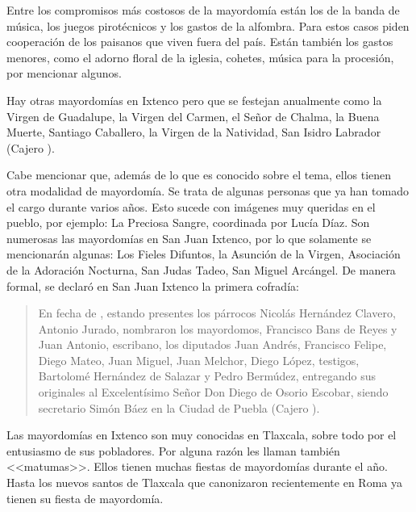 \documentclass[14pt,letterpaper,twoside]{extbook} %
\begin{document}
Entre los compromisos más costosos de la mayordomía están los de la banda de música, los juegos pirotécnicos y los gastos de la alfombra. Para estos casos piden cooperación de los paisanos que viven fuera del país. Están también los gastos menores, como el adorno floral de la iglesia, cohetes, música para la procesión, por mencionar algunos.

Hay otras mayordomías en Ixtenco pero que se festejan anualmente como la Virgen de Guadalupe, la Virgen del Carmen, el Señor de Chalma, la Buena Muerte, Santiago Caballero, la Virgen de la Natividad, San Isidro Labrador (Cajero ).

Cabe mencionar que, además de lo que es conocido sobre el tema, ellos tienen otra modalidad de mayordomía. Se trata de algunas personas que ya han tomado el cargo durante varios años. Esto sucede con imágenes muy queridas en el pueblo, por ejemplo: La Preciosa Sangre, coordinada por Lucía Díaz. Son numerosas las mayordomías en San Juan Ixtenco, por lo que solamente se mencionarán algunas: Los Fieles Difuntos, la Asunción de la Virgen, Asociación de la Adoración Nocturna, San Judas Tadeo, San Miguel Arcángel. De manera formal, se declaró en San Juan Ixtenco la primera cofradía:

\begin{quotation}
\noindent En fecha de , estando presentes los párrocos Nicolás Hernández Clavero, Antonio Jurado, nombraron los mayordomos, Francisco Bans de Reyes y Juan Antonio, escribano, los diputados Juan Andrés, Francisco Felipe, Diego Mateo, Juan Miguel, Juan Melchor, Diego López, testigos, Bartolomé Hernández de Salazar y Pedro Bermúdez, entregando sus originales al Excelentísimo Señor Don Diego de Osorio Escobar, siendo secretario Simón Báez en la Ciudad de Puebla (Cajero ).
\end{quotation}

\noindent Las mayordomías en Ixtenco son muy conocidas en Tlaxcala, sobre todo por el entusiasmo de sus pobladores. Por alguna razón les llaman también <<matumas>>. Ellos tienen muchas fiestas de mayordomías durante el año. Hasta los nuevos santos de Tlaxcala que canonizaron recientemente en Roma ya tienen su fiesta de mayordomía.
\end{document}
